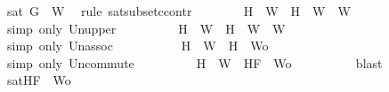 \begin{isabellebody}
\ {\isacartoucheopen}{\isasymnot}sat\ {\isacharparenleft}{\isacharbraceleft}G{\isacharbraceright}\ {\isasymunion}\ W{}{\isacharparenright}{\isacartoucheclose}\ \isamarkupfalse%
\ {\isacharparenleft}rule\ sat{\isacharunderscore}subset{\isacharunderscore}ccontr{\isacharparenright}\isanewline
\ \ \ \ \ \ \isamarkupfalse%
\ {\isachardoublequoteopen}{\isacharbraceleft}H{\isacharbraceright}\ {\isasymunion}\ W{}\ {\isasymsubseteq}\ {\isacharparenleft}{\isacharbraceleft}H{\isacharbraceright}\ {\isasymunion}\ W{}{\isacharparenright}\ {\isasymunion}\ W{}{\isachardoublequoteclose}\isanewline
\ \ \ \ \ \ \ \ \isamarkupfalse%
\ {\isacharparenleft}simp\ only{\isacharcolon}\ Un{\isacharunderscore}upper{}{\isacharparenright}\isanewline
\ \ \ \ \ \ \isamarkupfalse%
\ \isamarkupfalse%
\ {\isachardoublequoteopen}{\isacharbraceleft}H{\isacharbraceright}\ {\isasymunion}\ W{}\ {\isasymsubseteq}\ {\isacharbraceleft}H{\isacharbraceright}\ {\isasymunion}\ {\isacharparenleft}W{}\ {\isasymunion}\ W{}{\isacharparenright}{\isachardoublequoteclose}\isanewline
\ \ \ \ \ \ \ \ \isamarkupfalse%
\ {\isacharparenleft}simp\ only{\isacharcolon}\ Un{\isacharunderscore}assoc{\isacharparenright}\ \isanewline
\ \ \ \ \ \ \isamarkupfalse%
\ \isamarkupfalse%
\ {\isachardoublequoteopen}{\isacharbraceleft}H{\isacharbraceright}\ {\isasymunion}\ W{}\ {\isasymsubseteq}\ {\isacharbraceleft}H{\isacharbraceright}\ {\isasymunion}\ {\isacharquery}Wo{\isachardoublequoteclose}\isanewline
\ \ \ \ \ \ \ \ \isamarkupfalse%
\ {\isacharparenleft}simp\ only{\isacharcolon}\ Un{\isacharunderscore}commute{\isacharparenright}\isanewline
\ \ \ \ \ \ \isamarkupfalse%
\ \isamarkupfalse%
\ {\isachardoublequoteopen}{\isacharbraceleft}H{\isacharbraceright}\ {\isasymunion}\ W{}\ {\isasymsubseteq}\ {\isacharbraceleft}H{\isacharcomma}F{\isacharbraceright}\ {\isasymunion}\ {\isacharquery}Wo{\isachardoublequoteclose}\isanewline
\ \ \ \ \ \ \ \ \isamarkupfalse%
\ blast\isanewline
\ \ \ \ \ \ \isamarkupfalse%
\ \isamarkupfalse%
\ {}{\isacharcolon}{\isachardoublequoteopen}{\isasymnot}{\isacharparenleft}sat{\isacharparenleft}{\isacharbraceleft}H{\isacharcomma}F{\isacharbraceright}\ {\isasymunion}\ {\isacharquery}Wo{\isacharparenright}{\isacharparenright}{\isachardoublequoteclose}\isanewline

\end{isabellebody}
